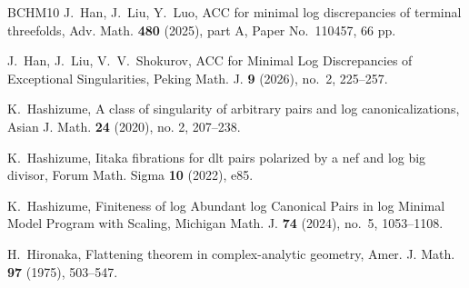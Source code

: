 \documentclass[12pt]{amsart}
\theoremstyle{definition}
\begin{document}
\begin{thebibliography}{BCHM10}
 J.~Han, J.~Liu, Y.~Luo, ACC for minimal log discrepancies of terminal threefolds, Adv. Math. {\textbf{480}} (2025), part A, Paper No.~110457, 66 pp. 

 J.~Han, J.~Liu, V.~V.~Shokurov, ACC for Minimal Log Discrepancies of Exceptional Singularities, Peking Math. J. {\textbf{9}} (2026), no.~2, 225--257.






 K.~Hashizume, A class of singularity of arbitrary pairs and log canonicalizations, Asian J. Math. {\textbf{24}} (2020), no. 2, 207--238. 




K.~Hashizume, 
Iitaka fibrations for dlt pairs polarized by a nef and log big divisor, Forum Math. Sigma {\textbf{10}} (2022), e85.  

 K.~Hashizume, Finiteness of log Abundant log Canonical Pairs in log Minimal Model Program with Scaling, Michigan Math. J. {\textbf{74}} (2024), no.~5, 1053--1108. 

 H.~Hironaka, Flattening theorem in complex-analytic geometry, Amer. J. Math. {\textbf{97}} (1975), 503--547.



\end{thebibliography}
\end{document}

